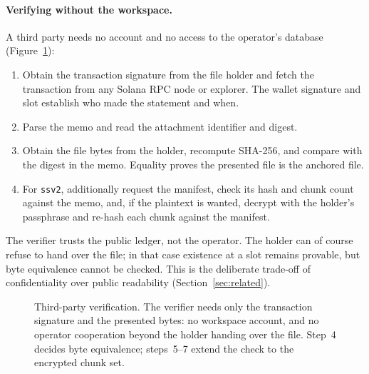\documentclass[10pt,a4paper,twocolumn]{article}
\begin{document}
\paragraph{Verifying without the workspace.}
A third party needs no account and no access to the operator's database
(Figure~\ref{fig:verify}):

\begin{enumerate}
  \item Obtain the transaction signature from the file holder and fetch the
        transaction from any Solana RPC node or explorer. The wallet signature and
        slot establish who made the statement and when.
  \item Parse the memo and read the attachment identifier and digest.
  \item Obtain the file bytes from the holder, recompute SHA-256, and compare with
        the digest in the memo. Equality proves the presented file is the anchored
        file.
  \item For \texttt{ssv2}, additionally request the manifest, check its hash and
        chunk count against the memo, and, if the plaintext is wanted, decrypt with
        the holder's passphrase and re-hash each chunk against the manifest.
\end{enumerate}

\noindent The verifier trusts the public ledger, not the operator. The holder can
of course refuse to hand over the file; in that case existence at a slot remains
provable, but byte equivalence cannot be checked. This is the deliberate trade-off
of confidentiality over public readability (Section~\ref{sec:related}).

\begin{figure}[t]
\centering
{}
\caption{Third-party verification. The verifier needs only the transaction
signature and the presented bytes: no workspace account, and no operator
cooperation beyond the holder handing over the file. Step~4 decides byte
equivalence; steps~5--7 extend the check to the encrypted chunk set.}
\label{fig:verify}
\end{figure}
\end{document}
